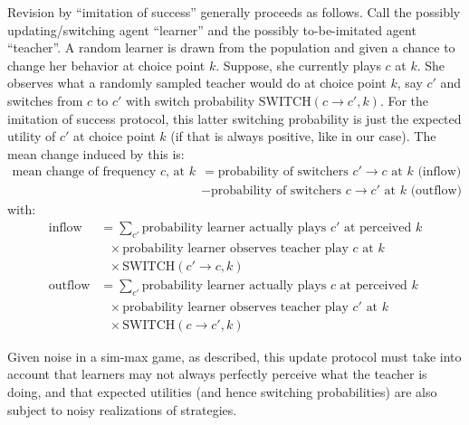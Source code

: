 \documentclass[fleqn,reqno,11pt]{article}
\begin{document}
Revision by ``imitation of success'' generally proceeds as follows. Call the possibly
updating/switching agent ``learner'' and the possibly to-be-imitated agent ``teacher''. A
random learner is drawn from the population and given a chance to change her behavior at choice
point $k$. Suppose, she currently plays $c$ at $k$. She observes what a randomly sampled
teacher would do at choice point $k$, say $c'$ and switches from $c$ to $c'$ with switch
probability $\text{SWITCH}(c \rightarrow c' , k)$. For the imitation of success protocol, this
latter switching probability is just the expected utility of $c'$ at choice point $k$ (if that
is always positive, like in our case). The mean change induced by this is:
\begin{align*}
  \text{mean change of frequency $c$, at $k$} & = \text{probability of switchers $c'
    \rightarrow c$ at $k$ (inflow)} \\
& - \text{probability of switchers $c \rightarrow c'$ at $k$ (outflow)}
\end{align*}
with:
\begin{align*}
  \text{inflow} & = \sum_{c'} \text{probability learner actually plays $c'$ at perceived $k$} \\
  & \ \ \ \times \text{probability learner observes teacher play $c$ at $k$} \\
  & \ \ \ \times \text{SWITCH}(c' \rightarrow c , k) \\
  \text{outflow} & = \sum_{c'} \text{probability learner actually plays $c$ at perceived $k$} \\
  & \ \ \ \times \text{probability learner observes teacher play $c'$ at $k$} \\
  & \ \ \ \times \text{SWITCH}(c \rightarrow c' , k)
\end{align*}

Given noise in a sim-max game, as described, this update protocol must take into account that
learners may not always perfectly perceive what the teacher is doing, and that expected
utilities (and hence switching probabilities) are also subject to noisy realizations of
strategies.
\end{document}
